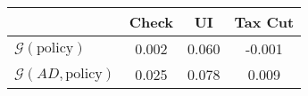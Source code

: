 \begin{tabular}{@{}lccc@{}} 
\toprule 
                          & Check      & UI    & Tax Cut    \\  \midrule 
$\mathcal{G}(\text{policy})$ & 0.002  & 0.060  & -0.001     \\ 
$\mathcal{G}(AD,\text{policy})$ & 0.025  & 0.078  & 0.009     \\ 
\end{tabular}  
